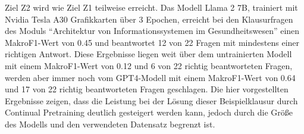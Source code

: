 Ziel Z2 wird wie Ziel Z1 teilweise erreicht.
Das Modell Llama 2 7B, trainiert mit Nvidia Tesla A30 Grafikkarten über 3 Epochen, erreicht bei den Klausurfragen des Moduls \enquote{Architektur von Informationssystemen im Gesundheitswesen} einen MakroF1-Wert von \num{0.45} und beantwortet \num{12} von \num{22} Fragen mit mindestens einer richtigen Antwort.
Diese Ergebnisse liegen weit über dem untrainierten Modell mit einem MakroF1-Wert von \num{0.12} und \num{6} von \num{22} richtig beantworteten Fragen, werden aber immer noch vom GPT4-Modell mit einem MakroF1-Wert von \num{0.64} und \num{17} von \num{22} richtig beantworteten Fragen geschlagen.
Die hier vorgestellten Ergebnisse zeigen, dass die Leistung bei der Lösung dieser Beispielklausur durch Continual Pretraining deutlich gesteigert werden kann, jedoch durch die Größe des Modells und den verwendeten Datensatz begrenzt ist.\\